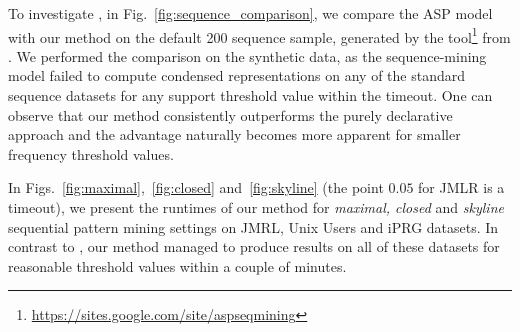 {To investigate \qone, in Fig.~\ref{fig:sequence_comparison}, we compare the ASP model \parencite{DBLP:conf/ijcai/GebserGQ0S16} with our method on the default 200 sequence sample, generated by the tool\footnote{\url{https://sites.google.com/site/aspseqmining}} from \parencite{DBLP:conf/ijcai/GebserGQ0S16}. We %
performed the comparison on the synthetic data, as the sequence-mining model \parencite{DBLP:conf/ijcai/GebserGQ0S16} failed to compute condensed representations on any of the standard sequence datasets for any support threshold value within the timeout. One can observe that our method consistently outperforms the purely declarative approach \parencite{DBLP:conf/ijcai/GebserGQ0S16} and the advantage naturally becomes more apparent for smaller frequency threshold values. %
 
In Figs.~\ref{fig:maximal},~\ref{fig:closed} and~\ref{fig:skyline} (the point $0.05$ for JMLR is a timeout), we present the runtimes of our method for \emph{maximal, closed} and \emph{skyline} sequential pattern mining settings on JMRL, Unix Users and iPRG datasets. In contrast to \parencite{DBLP:conf/ijcai/GebserGQ0S16}, our method managed to produce results on all of these datasets for reasonable threshold values within a couple of minutes.

}
